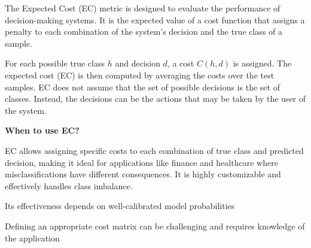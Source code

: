 The Expected Cost (EC) metric is designed to evaluate the performance of decision-making systems. It is the expected value of a cost function that assigns a penalty to each combination of the system's decision and the true class of a sample. 

\begin{center}
\end{center}

For each possible true class $h$ and decision $d$, a cost $C(h, d)$ is assigned. The expected cost (EC) is then computed by averaging the costs over the test samples. EC does not assume that the set of possible decisions is the set of classes. Instead, the decisions can be the actions that may be taken by the user of the system.


\textbf{When to use EC?}

EC allows assigning specific costs to each combination of true class and predicted decision, making it ideal for applications like finance and healthcare where misclassifications have different consequences. It is highly customizable and effectively handles class imbalance.

{
\item Its effectiveness depends on well-calibrated model probabilities 
\item Defining an appropriate cost matrix can be challenging and requires knowledge of the application 
}


